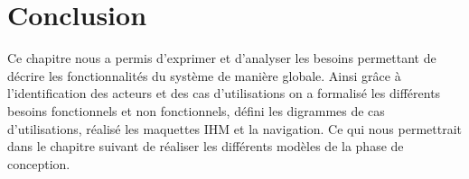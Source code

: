         
\section{Conclusion}
    Ce chapitre nous a permis d’exprimer et d’analyser les besoins permettant de décrire les fonctionnalités du système de manière globale. Ainsi grâce à l’identification des acteurs et des cas d’utilisations on a formalisé les différents besoins fonctionnels et non fonctionnels, défini les digrammes de cas d’utilisations, réalisé les maquettes IHM et la navigation. Ce qui nous permettrait dans le chapitre suivant de réaliser les différents modèles de la phase de conception.



